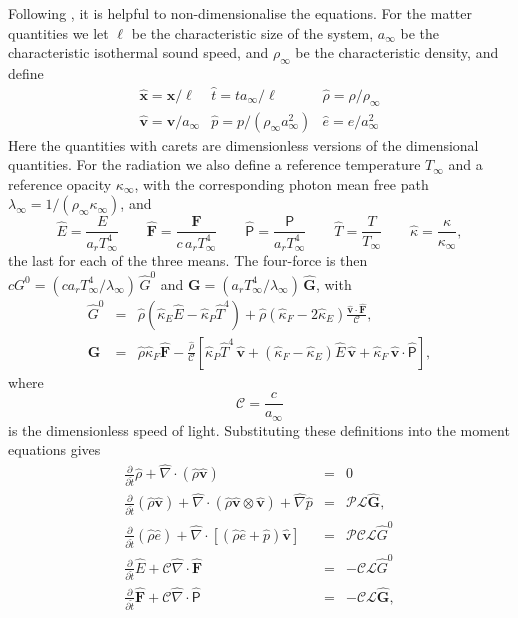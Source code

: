 \documentclass[preprint,12pt,authoryear]{elsarticle}
\newcommand{\vecx}{\mathbf{x}}
\newcommand{\vecG}{\mathbf{G}}
\newcommand{\vecF}{\mathbf{F}}
\newcommand{\tenP}{\mathsf{P}}
\newcommand{\hatt}{\hat{t}}
\newcommand{\hrho}{\hat{\rho}}
\newcommand{\he}{\hat{e}}
\newcommand{\hE}{\hat{E}}
\newcommand{\hnabla}{\hat{\nabla}}
\newcommand{\hp}{\hat{p}}
\newcommand{\hT}{\hat{T}}
\newcommand{\hvecv}{\hat{\mathbf{v}}}
\newcommand{\hvecx}{\hat{\mathbf{x}}}
\newcommand{\hvecF}{\hat{\mathbf{F}}}
\newcommand{\hvecG}{\hat{\mathbf{G}}}
\newcommand{\htenP}{\hat{\mathsf{P}}}
\newcommand{\calC}{\mathcal{C}}
\newcommand{\calP}{\mathcal{P}}
\newcommand{\calL}{\mathcal{L}}
\begin{document}
Following \citet{Lowrie99a}, it is helpful to non-dimensionalise the equations. For the matter quantities we let $\ell$ be the characteristic size of the system, $a_\infty$ be the characteristic isothermal sound speed, and $\rho_\infty$ be the characteristic density, and define
\begin{eqnarray}
\hvecx = \vecx/\ell & \hatt = t a_\infty/\ell & \hrho = \rho/\rho_\infty
\nonumber \\
\hvecv = \mathbf{v}/a_\infty & \hp = p/(\rho_\infty a_\infty^2) & \he = e/a_{\infty}^2
\end{eqnarray}
Here the quantities with carets are dimensionless versions of the dimensional quantities. For the radiation we also define a reference temperature $T_\infty$ and a reference opacity $\kappa_\infty$, with the corresponding photon mean free path $\lambda_\infty = 1/(\rho_\infty\kappa_\infty)$, and
\begin{equation}
\hE = \frac{E}{a_r T_\infty^4} \qquad
\hvecF = \frac{\vecF}{c\, a_r T_\infty^4} \qquad
\htenP = \frac{\tenP}{a_r T_\infty^4} \qquad
\hT = \frac{T}{T_\infty} \qquad
\hat{\kappa} = \frac{\kappa}{\kappa_\infty},
\end{equation}
the last for each of the three means. The four-force is then $cG^0 = (c a_r T_\infty^4/\lambda_\infty)\,\hat{G}^0$ and $\vecG = (a_r T_\infty^4/\lambda_\infty)\,\hvecG$, with
\begin{eqnarray}
\hat{G}^0 & = & \hrho\left(\hat{\kappa}_E\hE - \hat{\kappa}_P\hT^4\right) + \hrho\left(\hat{\kappa}_F - 2\hat{\kappa}_E\right)\frac{\hvecv\cdot\hvecF}{\calC},
\label{eq:G0_int_nondim}
\\
\hvecG & = & \hrho\hat{\kappa}_F\hvecF - \frac{\hrho}{\calC}\left[\hat{\kappa}_P\hT^4\,\hvecv + \left(\hat{\kappa}_F - \hat{\kappa}_E\right)\hE\,\hvecv + \hat{\kappa}_F\,\hvecv\cdot\htenP\right],
\label{eq:G_int_nondim}
\end{eqnarray}
where
\begin{equation}
\calC = \frac{c}{a_\infty}
\end{equation}
is the dimensionless speed of light. Substituting these definitions into the moment equations gives
\begin{eqnarray}
\frac{\partial}{\partial \hatt}\hrho + \hnabla\cdot\left(\hrho\hvecv\right) & = & 0 \\
\label{eq:gas_momentum}
\frac{\partial}{\partial \hatt}\left(\hrho \hvecv\right) + \hnabla\cdot\left(\hrho \hvecv\otimes\hvecv\right) + \hnabla \hat{p} & = & \calP \calL \hvecG, \\
\label{eq:gas_energy}
\frac{\partial}{\partial \hatt}\left(\hrho \he\right) +  \hnabla \cdot\left[\left(\hrho \he + \hat{p}\right)\hvecv\right]  & = & \calP \calC \calL \hat{G}^0 \\
\label{eq:rad_energy}
\frac{\partial}{\partial\hatt} \hE + \calC \hnabla\cdot\hvecF & = & -\calC \calL \hat{G}^0 \\
\label{eq:rad_momentum}
\frac{\partial}{\partial \hatt}\hvecF + \calC \hnabla \cdot \htenP & = & -\calC \calL \hvecG ,
\end{eqnarray}
\end{document}
